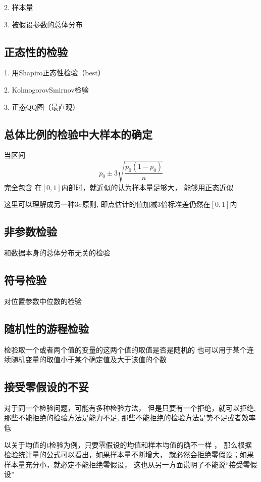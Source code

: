 \documentclass[UTF8,10pt]{book}
\begin{document}
        2. 样本量 

        3. 被假设参数的总体分布

        \subsection{正态性的检验}	
        1. 用Shapiro正态性检验（best） 

        2. KolmogorovSmirnov检验 

        3. 正态QQ图（最直观）

        \subsection{总体比例的检验中大样本的确定}	
        当区间 $$ p_0 \pm 3 \sqrt{\frac{p_0(1-p_0)}{n}} $$ 完全包含
        在$[0,1]$内部时，就近似的认为样本量足够大，
        能够用正态近似 
        
        这里可以理解成另一种$3\sigma$原则,
        即点估计的值加减3倍标准差仍然在$[0,1]$内
        
        \subsection{非参数检验}	
        
        和数据本身的总体分布无关的检验
        
        \subsection{符号检验}	
        对位置参数中位数的检验

        \subsection{随机性的游程检验}	
        检验取一个或者两个值的变量的这两个值的取值是否是随机的 
        也可以用于某个连续随机变量的取值小于某个确定值及大于该值的个数
        
        \subsection{接受零假设的不妥}	
        对于同一个检验问题，可能有多种检验方法，
        但是只要有一个拒绝，就可以拒绝,
        那些不能拒绝的检验方法是能力不足,
        那些不能拒绝的检验方法是势不足或者效率低

        {\kaishu 以关于均值的t检验为例，只要零假设的均值和样本均值的确不一样	，
        那么根据检验统计量的公式可以看出，如果样本量不断增大，
        就必然会拒绝零假设；如果样本量充分小，就必定不能拒绝零假设，
        这也从另一方面说明了不能说“接受零假设”}
\end{document}
